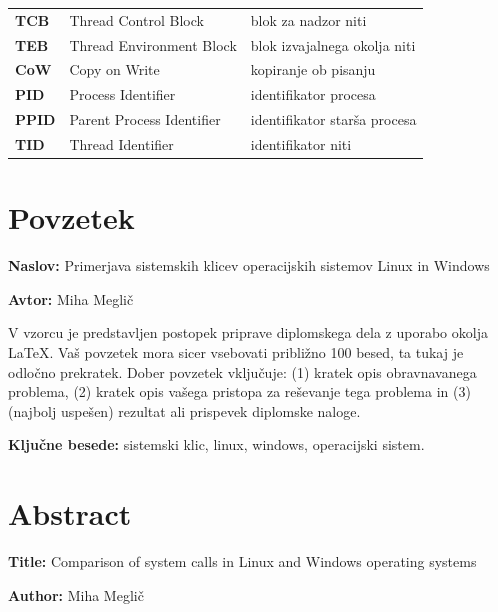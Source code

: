 \documentclass[a4paper,12pt,openright]{book}
\newcommand{\ttitle}{Primerjava sistemskih klicev operacijskih sistemov Linux in Windows}
\newcommand{\ttitleEn}{Comparison of system calls in Linux and Windows operating systems}
\newcommand{\tauthor}{Miha Meglič}
\newcommand{\tkeywords}{sistemski klic, linux, windows, operacijski sistem}
\newcommand{\clearemptydoublepage}{\newpage{\pagestyle{empty}\cleardoublepage}}
\begin{document}
\begin{tabular}{p{}|p{}|p{}}
{\bf TCB}     & Thread Control Block                & blok za nadzor niti                        \\
{\bf TEB}     & Thread Environment Block            & blok izvajalnega okolja niti               \\
{\bf CoW}     & Copy on Write                       & kopiranje ob pisanju                       \\
{\bf PID}     & Process Identifier                  & identifikator procesa                      \\
{\bf PPID}    & Parent Process Identifier           & identifikator starša procesa               \\
{\bf TID}     & Thread Identifier                   & identifikator niti                         \\
\end{tabular}


\clearemptydoublepage

\chapter*{Povzetek}

\noindent\textbf{Naslov:} \ttitle
\bigskip

\noindent\textbf{Avtor:} \tauthor
\bigskip

\noindent V vzorcu je predstavljen postopek priprave diplomskega dela z uporabo okolja \LaTeX. Vaš povzetek mora sicer vsebovati približno 100 besed, ta tukaj je odločno prekratek.
Dober povzetek vključuje: (1) kratek opis obravnavanega problema, (2) kratek opis vašega pristopa za reševanje tega problema in (3) (najbolj uspešen) rezultat ali prispevek diplomske naloge.

\bigskip

\noindent\textbf{Ključne besede:} \tkeywords.
\clearemptydoublepage

\chapter*{Abstract}

\noindent\textbf{Title:} \ttitleEn
\bigskip

\noindent\textbf{Author:} \tauthor
\bigskip
\end{document}
